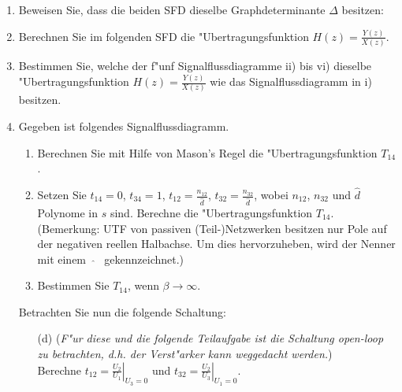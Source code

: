 \begin{enumerate}
\item Beweisen Sie, dass die beiden SFD dieselbe
  Graphdeterminante $\Delta$ besitzen:
  \begin{center}
   \end{center}

 \item Berechnen Sie im folgenden SFD die
   "Ubertragungsfunktion $H(z)=\frac{Y(z)}{X(z)}$.
   \begin{center}
 \end{center}
\newpage
\item Bestimmen Sie, welche der f"unf Signalflussdiagramme ii) bis vi)
  dieselbe "Ubertragungsfunktion $H(z)=\frac{Y(z)}{X(z)}$ wie das
  Signalflussdiagramm in i) besitzen. \vspace*{-4mm}
  \begin{center}
\end{center}
\newpage
\item Gegeben ist folgendes Signalflussdiagramm.\\
\begin{center}
  \end{center}
\vspace*{-4mm}
\begin{enumerate}  
  \item
    Berechnen Sie mit Hilfe von Mason's Regel die "Ubertragungsfunktion $T_{14}$.
  \item \label{Teil1} Setzen Sie $t_{14}=0$, $t_{34}=1$,
    $t_{12}=\frac{n_{12}}{\hat d}$, $t_{32}=\frac{n_{32}}{\hat d}$,
    wobei $n_{12}$, $n_{32}$ und $\hat d$ Polynome in $s$ sind.
    Berechne die "Ubertragungsfunktion $T_{14}$.\\ (Bemerkung:
    UTF von passiven (Teil-)Netzwerken besitzen nur Pole auf der
    negativen reellen Halbachse. Um dies hervorzuheben, wird der
    Nenner mit einem ~$\hat{}$~ gekennzeichnet.)
  \item
    Bestimmen Sie $T_{14}$, wenn $\beta \rightarrow \infty$.
\end{enumerate}
Betrachten Sie nun die folgende Schaltung:\\
\vspace*{-4mm}\begin{center}
  \end{center}
\begin{enumerate}
\item[(d)] \label{Teil2} (\emph{F"ur diese und die folgende Teilaufgabe
    ist die Schaltung open-loop zu betrachten, d.h. der Verst"arker
    kann weggedacht werden.})\\ 
    Berechne
    $t_{12}=\left.\frac{U_2}{U_1}\right|_{U_3=0}$ und
    $t_{32}=\left.\frac{U_2}{U_3}\right|_{U_1=0}$.


\end{enumerate}
\end{enumerate}
